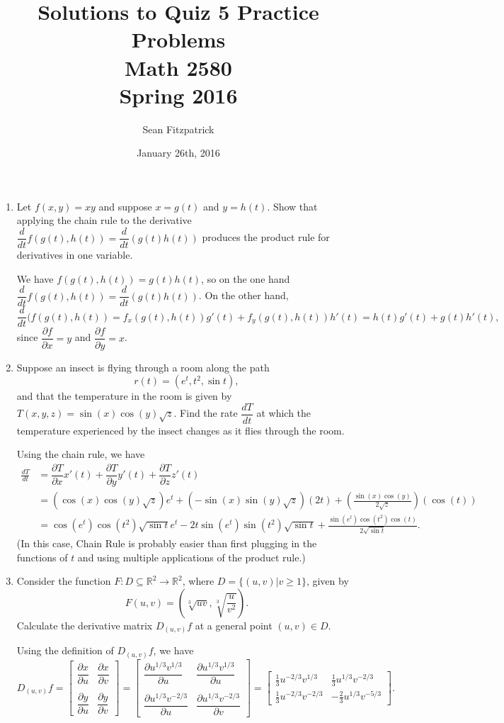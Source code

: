 \documentclass[letterpaper,12pt]{article}
\title{Solutions to Quiz 5 Practice Problems\\Math 2580\\Spring 2016}
\author{Sean Fitzpatrick}
\date{January 26th, 2016}
\newcommand{\R}{\mathbb{R}}
\newcommand{\bbm}{\begin{bmatrix}}
\newcommand{\ebm}{\end{bmatrix}}
\newcommand{\pd}[2]{\dfrac{\partial #1}{\partial #2}}
\begin{document}
 \maketitle


\begin{enumerate}
 \item Let $f(x,y)=xy$ and suppose $x=g(t)$ and $y=h(t)$. Show that applying the chain rule to the derivative $
\dfrac{d}{dt}f(g(t),h(t))= \dfrac{d}{dt}(g(t)h(t))$ produces the product rule for derivatives in one variable.

\bigskip

We have $f(g(t),h(t)) = g(t)h(t)$, so on the one hand $\dfrac{d}{dt}f(g(t),h(t)) = \dfrac{d}{dt}(g(t)h(t))$. On the other hand, 
\[
 \frac{d}{dt}(f(g(t),h(t)) = f_x(g(t),h(t))g'(t)+f_y(g(t),h(t))h'(t) = h(t)g'(t)+g(t)h'(t),
\]
since $\pd{f}{x}=y$ and $\pd{f}{y}=x$.

\bigskip

 \item Suppose an insect is flying through a room along the path
 \[
 r(t) = (e^t, t^2, \sin t),
 \]
 and that the temperature in the room is given by $T(x,y,z) = \sin(x)\cos(y)\sqrt{z}$. Find the rate $\dfrac{dT}{dt}$ at which the temperature experienced by the insect changes as it flies through the room.

\bigskip

Using the chain rule, we have
\begin{align*}
 \frac{dT}{dt} &= \pd{T}{x}x'(t)+\pd{T}{y}y'(t)+\pd{T}{z}z'(t)\\
& = (\cos(x)\cos(y)\sqrt{z})e^t+(-\sin(x)\sin(y)\sqrt{z})(2t)+\left(\frac{\sin(x)\cos(y)}{2\sqrt{z}}\right)(\cos(t))\\
& = \cos(e^t)\cos(t^2)\sqrt{\sin t}e^t-2t\sin(e^t)\sin(t^2)\sqrt{\sin t}+\frac{\sin(e^t)\cos(t^2)\cos(t)}{2\sqrt{\sin t}}.
\end{align*}
(In this case, Chain Rule is probably easier than first plugging in the functions of $t$ and using multiple applications of the product rule.)

\bigskip

 \item Consider the function $F:D\subseteq \R^2\to\R^2$, where $D=\{(u,v)|v\geq 1\}$, given by
 \[
 F(u,v) = \left(\sqrt[3]{uv},\sqrt[3]{\frac{u}{v^2}}\right).
 \]
 Calculate the derivative matrix $D_{(u,v)}f$ at a general point $(u,v)\in D$.
 
\bigskip

Using the definition of $D_{(u,v)}f$, we have
\[
 D_{(u,v)}f = \bbm \pd{x}{u} & \pd{x}{v}\\ & \\ \pd{y}{u} & \pd{y}{v}\ebm = \bbm \pd{u^{1/3}v^{1/3}}{u} & \pd{u^{1/3}v^{1/3}}{u} \\ & \\ \pd{u^{1/3}v^{-2/3}}{u} & \pd{u^{1/3}v^{-2/3}}{v} \ebm = \bbm \frac{1}{3}u^{-2/3}v^{1/3} & \frac{1}{3}u^{1/3}v^{-2/3}\\ \frac{1}{3}u^{-2/3}v^{-2/3} & -\frac{2}{3}u^{1/3}v^{-5/3}\ebm.
\]
 

\end{enumerate}
\end{document}
